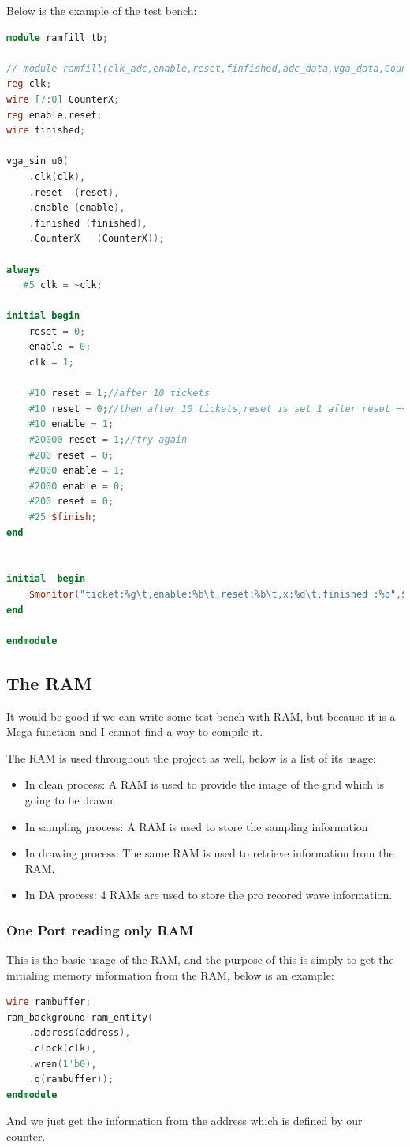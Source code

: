 \documentclass[11pt]{scrartcl}
\begin{document}
Below is the example of the test bench:
\begin{lstlisting}[language=Verilog]
module ramfill_tb;

// module ramfill(clk_adc,enable,reset,finfished,adc_data,vga_data,CounterX);
reg clk;
wire [7:0] CounterX;
reg enable,reset;
wire finished;

vga_sin u0(
	.clk(clk), 
	.reset	(reset),
	.enable (enable),
	.finished (finished), 
	.CounterX	(CounterX));

always  
   #5 clk = ~clk; 
    
initial begin
	reset = 0;
	enable = 0;
	clk = 1;

	#10 reset = 1;//after 10 tickets
	#10 reset = 0;//then after 10 tickets,reset is set 1 after reset == 1 is kept for 10 tickets
	#10 enable = 1;
	#20000 reset = 1;//try again
	#200 reset = 0;
	#2000 enable = 1;
	#2000 enable = 0;
	#200 reset = 0;
	#25 $finish; 
end


initial  begin
    $monitor("ticket:%g\t,enable:%b\t,reset:%b\t,x:%d\t,finished :%b",$time,enable,reset,CounterX,finished); 
end 

endmodule
\end{lstlisting}

\subsection{The RAM}
It would be good if we can write some test bench with RAM, but because it is a Mega function and I cannot find a way to compile it.


The RAM is used throughout the project as well, below is a list of its usage:
\begin{itemize}
    \item In clean process: A RAM is used to provide the image of the grid which is going to be drawn.
    \item In sampling process: A RAM is used to store the sampling information
    \item In drawing process: The same RAM is used to retrieve information from the RAM.
    \item In DA process: 4 RAMs are used to store the pro recored wave information. 
    \end{itemize}
\subsubsection{One Port reading only RAM}
\label{sec:siram}
This is the basic usage of the RAM, and the purpose of this is simply to get the initialing memory information from the RAM, below is an example:
\begin{lstlisting}[language=Verilog]
wire rambuffer;
ram_background ram_entity(
 	.address(address),
 	.clock(clk),
 	.wren(1'b0),
 	.q(rambuffer));
endmodule
\end{lstlisting}
And we just get the information from the address which is defined by our counter.
\end{document}

